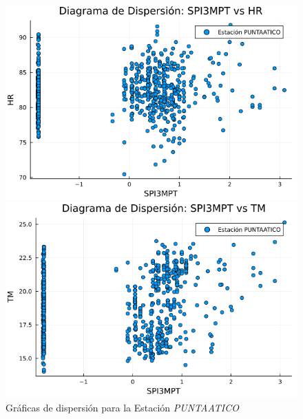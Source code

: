 \begin{figure}[htbp]
\centering
\caption{Gráficas de dispersión para la Estación \textit{PUNTAATICO}}
\begin{minipage}{0.32\textwidth}
    \centering
    \includegraphics[width=\linewidth]{Capitulos/Scaterplot/PUNTAATICO_SPI3MPT_vs_HR.png}
\end{minipage}\hfill
\begin{minipage}{0.32\textwidth}
    \centering
    \includegraphics[width=\linewidth]{Capitulos/Scaterplot/PUNTAATICO_SPI3MPT_vs_TM.png}
\end{minipage}\hfill
\begin{minipage}{0.32\textwidth}
    \centering

\end{minipage}
\end{figure}
